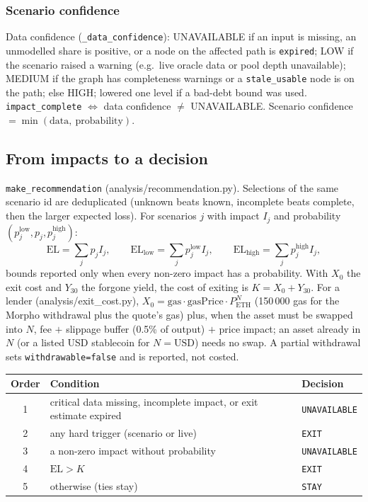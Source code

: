 \documentclass[11pt,a4paper]{article}
\newcommand{\code}[1]{\texttt{#1}}
\newcommand{\src}[1]{\textsf{\small #1}}
\begin{document}
\subsubsection{Scenario confidence}\label{sec:confidence}

Data confidence (\code{\_data\_confidence}): UNAVAILABLE if an input is missing,
an unmodelled share is positive, or a node on the affected path is
\code{expired}; LOW if the scenario raised a warning (e.g.\ live oracle data or
pool depth unavailable); MEDIUM if the graph has completeness warnings or a
\code{stale\_usable} node is on the path; else HIGH; lowered one level if a
bad-debt bound was used. \code{impact\_complete} $\iff$ data confidence $\neq$
UNAVAILABLE. Scenario confidence $=\min(\text{data},\ \text{probability})$.

\subsection{From impacts to a decision}

\code{make\_recommendation} (\src{analysis/recommendation.py}). Selections of the
same scenario id are deduplicated (unknown beats known, incomplete beats complete,
then the larger expected loss). For scenarios $j$ with impact $I_j$ and
probability $(p^{\text{low}}_j,p_j,p^{\text{high}}_j)$:
\begin{equation}
\mathrm{EL}=\sum_j p_j I_j,\qquad \mathrm{EL}_{\text{low}}=\sum_j p^{\text{low}}_j I_j,\qquad
\mathrm{EL}_{\text{high}}=\sum_j p^{\text{high}}_j I_j,
\end{equation}
bounds reported only when every non-zero impact has a probability. With
$X_0$ the exit cost and $Y_{30}$ the forgone yield, the cost of exiting is
$K=X_0+Y_{30}$. For a lender (\src{analysis/exit\_cost.py}),
$X_0=\text{gas}\cdot\text{gasPrice}\cdot P_{\text{ETH}}^{N}$ (150\,000 gas for the
Morpho withdrawal plus the quote's gas) plus, when the asset must be swapped into
$N$, fee $+$ slippage buffer (0.5\% of output) $+$ price impact; an asset already
in $N$ (or a listed USD stablecoin for $N=\text{USD}$) needs no swap. A partial
withdrawal sets \code{withdrawable=false} and is reported, not costed.

\begin{center}\small
\begin{tabular}{@{}cll@{}}
\toprule
Order & Condition & Decision \\
\midrule
1 & critical data missing, incomplete impact, or exit estimate expired & \code{UNAVAILABLE} \\
2 & any hard trigger (scenario or live) & \code{EXIT} \\
3 & a non-zero impact without probability & \code{UNAVAILABLE} \\
4 & $\mathrm{EL}>K$ & \code{EXIT} \\
5 & otherwise (ties stay) & \code{STAY} \\
\bottomrule
\end{tabular}
\end{center}
\end{document}
